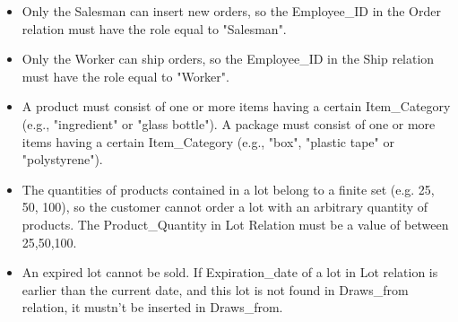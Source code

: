 \begin{itemize}
\item Only the Salesman can insert new orders, so the Employee\_ID in the Order relation must have the role equal to "Salesman". 
\item Only the Worker can ship orders, so the Employee\_ID in the Ship relation must have the role equal to "Worker".
\item A product must consist of one or more items having a certain Item\_Category (e.g., "ingredient" or "glass bottle"). A package must consist of one or more items having a certain Item\_Category (e.g., "box", "plastic tape" or "polystyrene"). 
\item The quantities of products contained in a lot belong to a finite set (e.g. 25, 50, 100), so the customer cannot order a lot with an arbitrary quantity of products. The Product\_Quantity in Lot Relation must be a value of between 25,50,100.
\item An expired lot cannot be sold. If Expiration\_date of a lot in  Lot relation is earlier than the current date, and this lot is not found in Draws\_from relation, it mustn't be  inserted in Draws\_from.
\end{itemize}
